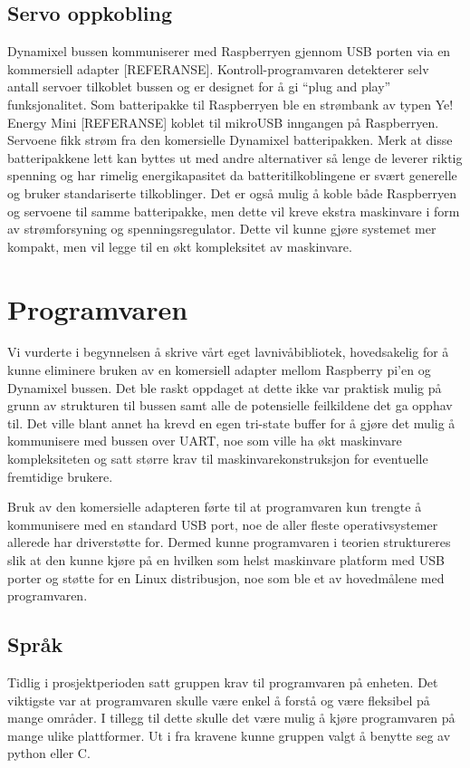 \documentclass[12pt]{report}
\begin{document}
\subsection{Servo oppkobling}
Dynamixel bussen kommuniserer med Raspberryen gjennom USB porten via en kommersiell adapter [REFERANSE]. Kontroll-programvaren detekterer selv antall servoer tilkoblet bussen og er designet for å gi “plug and play” funksjonalitet. Som batteripakke til Raspberryen ble en strømbank av typen Ye! Energy Mini [REFERANSE] koblet til mikroUSB inngangen på Raspberryen. Servoene fikk strøm fra den komersielle Dynamixel batteripakken. Merk at disse batteripakkene lett kan byttes ut med andre alternativer så lenge de leverer riktig spenning og har rimelig energikapasitet da batteritilkoblingene er svært generelle og bruker standariserte tilkoblinger. Det er også mulig å koble både Raspberryen og servoene til samme batteripakke, men dette vil kreve ekstra maskinvare i form av strømforsyning og spenningsregulator. Dette vil kunne gjøre systemet mer kompakt, men vil legge til en økt kompleksitet av maskinvare.

\section{Programvaren}
Vi vurderte i begynnelsen å skrive vårt eget lavnivåbibliotek, hovedsakelig for å kunne eliminere bruken av en komersiell adapter mellom Raspberry pi’en og Dynamixel bussen. Det ble raskt oppdaget at dette ikke var praktisk mulig på grunn av strukturen til bussen samt alle de potensielle feilkildene det ga opphav til. Det ville blant annet ha krevd en egen tri-state buffer for å gjøre det mulig å kommunisere med bussen over UART, noe som ville ha økt maskinvare kompleksiteten og satt større krav til maskinvarekonstruksjon for eventuelle fremtidige brukere.

Bruk av den komersielle adapteren førte til at programvaren kun trengte å kommunisere med en standard USB port, noe de aller fleste operativsystemer allerede har driverstøtte for. Dermed kunne programvaren i teorien struktureres slik at den kunne kjøre på en hvilken som helst maskinvare platform med USB porter og støtte for en Linux distribusjon, noe som ble et av hovedmålene med programvaren.

\subsection{Språk}
Tidlig i prosjektperioden satt gruppen krav til programvaren på enheten. Det viktigste var at programvaren skulle være enkel å forstå og være fleksibel på mange områder. I tillegg til dette skulle det være mulig å kjøre programvaren på mange ulike plattformer. Ut i fra kravene kunne gruppen valgt å benytte seg av python eller C. 
\end{document}
